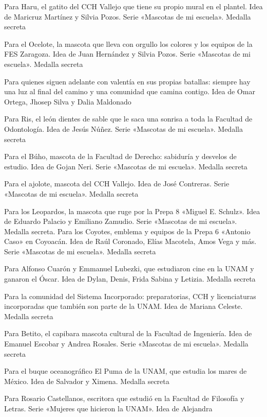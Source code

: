 \begin{description}[leftmargin=1.4cm, style=nextline]
  \item[H4RU] Para Haru, el gatito del CCH Vallejo que tiene su propio mural en el plantel. Idea de Maricruz Martínez y Silvia Pozos. Serie «Mascotas de mi escuela». Medalla secreta
  \item[0C3L0T3] Para el Ocelote, la mascota que lleva con orgullo los colores y los equipos de la FES Zaragoza. Idea de Juan Hernández y Silvia Pozos. Serie «Mascotas de mi escuela». Medalla secreta
  \item[3SP3R4NZ4] Para quienes siguen adelante con valentía en sus propias batallas: siempre hay una luz al final del camino y una comunidad que camina contigo. Idea de Omar Ortega, Jhosep Silva y Dalia Maldonado
  \item[S0NRIS4] Para Ris, el león dientes de sable que le saca una sonrisa a toda la Facultad de Odontología. Idea de Jesús Núñez. Serie «Mascotas de mi escuela». Medalla secreta
  \item[BUH0] Para el Búho, mascota de la Facultad de Derecho: sabiduría y desvelos de estudio. Idea de Gojan Neri. Serie «Mascotas de mi escuela». Medalla secreta
  \item[4J0L0T3] Para el ajolote, mascota del CCH Vallejo. Idea de José Contreras. Serie «Mascotas de mi escuela». Medalla secreta
  \item[L30P4RD0] Para los Leopardos, la mascota que ruge por la Prepa 8 «Miguel E. Schulz». Idea de Eduardo Palacio y Emiliano Zamudio. Serie «Mascotas de mi escuela». Medalla secreta. Para los Coyotes, emblema y equipos de la Prepa 6 «Antonio Caso» en Coyoacán. Idea de Raúl Coronado, Elías Macotela, Amos Vega y más. Serie «Mascotas de mi escuela». Medalla secreta
  \item[0SC4R] Para Alfonso Cuarón y Emmanuel Lubezki, que estudiaron cine en la UNAM y ganaron el Óscar. Idea de Dylan, Denis, Frida Sabina y Letizia. Medalla secreta
  \item[DG1R3] Para la comunidad del Sistema Incorporado: preparatorias, CCH y licenciaturas incorporadas que también son parte de la UNAM. Idea de Mariana Celeste. Medalla secreta
  \item[B3T1T0] Para Betito, el capibara mascota cultural de la Facultad de Ingeniería. Idea de Emanuel Escobar y Andrea Rosales. Serie «Mascotas de mi escuela». Medalla secreta
  \item[B0PUM3] Para el buque oceanográfico El Puma de la UNAM, que estudia los mares de México. Idea de Salvador y Ximena. Medalla secreta
  \item[CH4Y0] Para Rosario Castellanos, escritora que estudió en la Facultad de Filosofía y Letras. Serie «Mujeres que hicieron la UNAM». Idea de Alejandra

\end{description}
